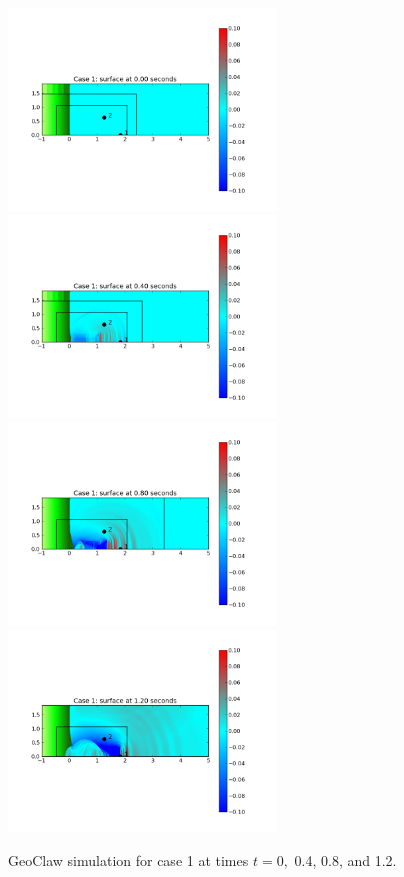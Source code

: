 {\begin{figure}[ht]
\hfil\includegraphics[width=2.8in]{bp12/case1pcolor0.png}\hfil
\hfil\includegraphics[width=2.8in]{bp12/case1pcolor4.png}\hfil
\vskip 5pt
\hfil\includegraphics[width=2.8in]{bp12/case1pcolor8.png}\hfil
\hfil\includegraphics[width=2.8in]{bp12/case1pcolor12.png}\hfil
\caption{\label{fig:bp8pcolorcase1}
GeoClaw simulation for case 1 at times $t = 0,$ 0.4, 0.8, and 1.2.
  }
\end{figure}


}
